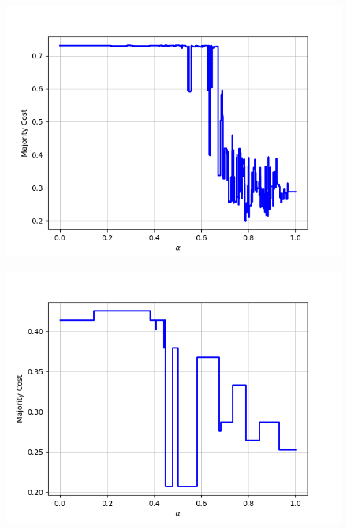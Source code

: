 \begin{figure}[h]
\begin{minipage}{.24\textwidth}
\end{minipage}
\begin{minipage}{.24\textwidth}
  \centering
  {\includegraphics[width=\linewidth]{plots/nell-sc/food}}
\end{minipage}
\begin{minipage}{.24\textwidth}
  \centering
  {\includegraphics[width=\linewidth]{plots/nell-sc/fruit}}
\end{minipage}
\begin{minipage}{.24\textwidth}
  \centering

\end{minipage}
\end{figure}
